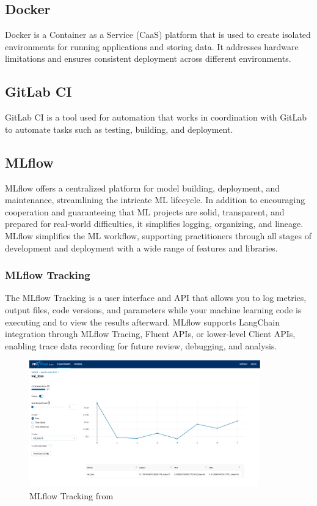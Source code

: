     \subsection{Docker}
    Docker is a Container as a Service (CaaS) platform that is used to create isolated environments for running applications and storing data. It addresses hardware limitations and ensures consistent deployment across different environments.
    \subsection{GitLab CI}
    GitLab CI is a tool used for automation that works in coordination with GitLab to automate tasks such as testing, building, and deployment.
    \subsection{MLflow}
    MLflow offers a centralized platform for model building, deployment, and maintenance, streamlining the intricate ML lifecycle.  In addition to encouraging cooperation and guaranteeing that ML projects are solid, transparent, and prepared for real-world difficulties, it simplifies logging, organizing, and lineage. MLflow simplifies the ML workflow, supporting practitioners through all stages of development and deployment with a wide range of features and libraries.
    \cite{mlflow}
        \subsubsection{MLflow Tracking}
        The MLflow Tracking is a user interface and API that allows you to log metrics, output files, code versions, and parameters while your machine learning code is executing and to view the results afterward. MLflow supports LangChain integration through MLflow Tracing, Fluent APIs, or lower-level Client APIs, enabling trace data recording for future review, debugging, and analysis.
        \begin{figure}[H]
            \centering
            \includegraphics[width=10cm]{chapters/2/figures/mlflow-tracking-metrics-ui.png}
            \caption[MLflow Tracking]{MLflow Tracking  from~\cite{mlflow}}
            \label{fig:mlflow-tracking-metrics-ui}
        \end{figure}
